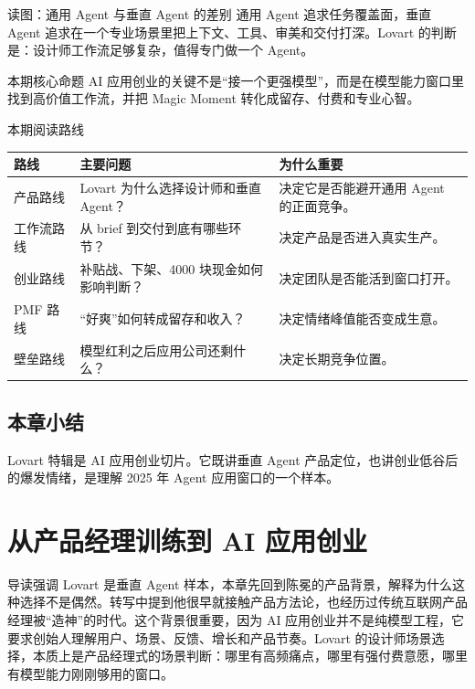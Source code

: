 \documentclass[a4paper]{article}
\begin{document}
\begin{knowledgebox}{读图：通用 Agent 与垂直 Agent 的差别}
通用 Agent 追求任务覆盖面，垂直 Agent 追求在一个专业场景里把上下文、工具、审美和交付打深。Lovart 的判断是：设计师工作流足够复杂，值得专门做一个 Agent。
\end{knowledgebox}

\begin{importantbox}{本期核心命题}
AI 应用创业的关键不是“接一个更强模型”，而是在模型能力窗口里找到高价值工作流，并把 Magic Moment 转化成留存、付费和专业心智。
\end{importantbox}

\begin{knowledgebox}{本期阅读路线}
\begin{tabularx}{\textwidth}{p{}p{}X}
\toprule
路线 & 主要问题 & 为什么重要 \\
\midrule
产品路线 & Lovart 为什么选择设计师和垂直 Agent？ & 决定它是否能避开通用 Agent 的正面竞争。 \\
工作流路线 & 从 brief 到交付到底有哪些环节？ & 决定产品是否进入真实生产。 \\
创业路线 & 补贴战、下架、4000 块现金如何影响判断？ & 决定团队是否能活到窗口打开。 \\
PMF 路线 & “好爽”如何转成留存和收入？ & 决定情绪峰值能否变成生意。 \\
壁垒路线 & 模型红利之后应用公司还剩什么？ & 决定长期竞争位置。 \\
\bottomrule
\end{tabularx}
\end{knowledgebox}

\subsection{本章小结}

Lovart 特辑是 AI 应用创业切片。它既讲垂直 Agent 产品定位，也讲创业低谷后的爆发情绪，是理解 2025 年 Agent 应用窗口的一个样本。

\section{从产品经理训练到 AI 应用创业}

导读强调 Lovart 是垂直 Agent 样本，本章先回到陈冕的产品背景，解释为什么这种选择不是偶然。转写中提到他很早就接触产品方法论，也经历过传统互联网产品经理被“造神”的时代。这个背景很重要，因为 AI 应用创业并不是纯模型工程，它要求创始人理解用户、场景、反馈、增长和产品节奏。Lovart 的设计师场景选择，本质上是产品经理式的场景判断：哪里有高频痛点，哪里有强付费意愿，哪里有模型能力刚刚够用的窗口。
\end{document}
